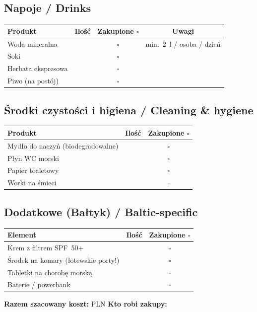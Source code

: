 \documentclass[a4paper,11pt]{article}
\begin{document}
\vspace{0.3cm}

\subsection*{Napoje / Drinks}
\begin{tabularx}{\linewidth}{|X|c|c|c|}
\hline
\textbf{Produkt} & \textbf{Ilość} & \textbf{Zakupione \(\square\)} & \textbf{Uwagi} \\
\hline
Woda mineralna & & \(\square\) & min.\ 2~l / osoba / dzień \\[4pt]\hline
Soki & & \(\square\) & \\[4pt]\hline
Herbata ekspresowa & & \(\square\) & \\[4pt]\hline
Piwo (na postój) & & \(\square\) & \\[4pt]\hline
\end{tabularx}

\vspace{0.3cm}

\subsection*{Środki czystości i higiena / Cleaning \& hygiene}
\begin{tabularx}{\linewidth}{|X|c|c|}
\hline
\textbf{Produkt} & \textbf{Ilość} & \textbf{Zakupione \(\square\)} \\
\hline
Mydło do naczyń (biodegradowalne) & & \(\square\) \\[4pt]\hline
Płyn WC morski & & \(\square\) \\[4pt]\hline
Papier toaletowy & & \(\square\) \\[4pt]\hline
Worki na śmieci & & \(\square\) \\[4pt]\hline
\end{tabularx}

\vspace{0.3cm}

\subsection*{Dodatkowe (Bałtyk) / Baltic-specific}
\begin{tabularx}{\linewidth}{|X|c|c|}
\hline
\textbf{Element} & \textbf{Ilość} & \textbf{Zakupione \(\square\)} \\
\hline
Krem z filtrem SPF~50+ & & \(\square\) \\[4pt]\hline
Środek na komary (łotewskie porty!) & & \(\square\) \\[4pt]\hline
Tabletki na chorobę morską & & \(\square\) \\[4pt]\hline
Baterie / powerbank & & \(\square\) \\[4pt]\hline
\end{tabularx}

\vspace{0.4cm}
\noindent\textbf{Razem szacowany koszt:} \field{4cm} PLN \hfill \textbf{Kto robi zakupy:} \field{5cm}
\end{document}
